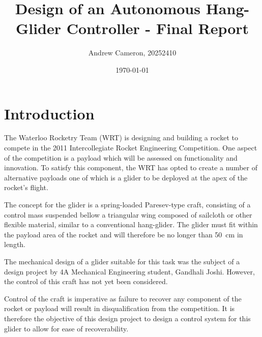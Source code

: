 \documentclass{sydeStyle}
\title{
Design of an Autonomous Hang-Glider Controller - Final Report
}
\date{\today}
\author{Andrew Cameron, 20252410}
\begin{document}
\maketitle

\tableofcontents

\chapter{Introduction}

The Waterloo Rocketry Team (WRT) is designing and building a rocket to compete
in the 2011 Intercollegiate Rocket Engineering Competition. One aspect of the
competition is a payload which will be assessed on functionality and
innovation\cite{IREC}. To satisfy this component, the WRT has opted to create a
number of alternative payloads one of which is a glider to be deployed at the apex
of the rocket's flight.

The concept for the glider is a spring-loaded Paresev-type craft,
consisting of a control mass suspended bellow a triangular wing composed of
sailcloth or other flexible material, similar to a conventional
hang-glider\cite{wiki:parasev}. The glider must fit within the payload area of
the rocket and will therefore be no longer than 50~cm in length.

The mechanical design of a glider suitable for this task was the subject of a
design project by 4A Mechanical Engineering student, Gandhali Joshi. However,
the control of this craft has not yet been considered.

Control of the craft is imperative as failure to recover any component of
the rocket or payload will result in disqualification from the
competition\cite{IREC}. It is therefore the objective of this design project to
design a control system for this glider to allow for ease of recoverability.
\end{document}
